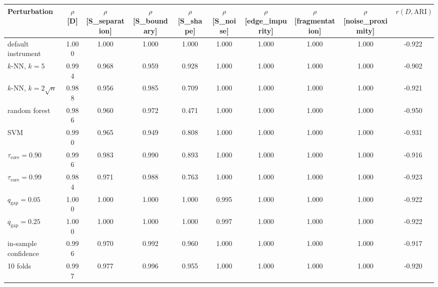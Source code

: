 \begin{tabular}{@{}lccccccccc@{}}
\toprule
Perturbation & $\rho$[D] & $\rho$[S\_separation] & $\rho$[S\_boundary] & $\rho$[S\_shape] & $\rho$[S\_noise] & $\rho$[edge\_impurity] & $\rho$[fragmentation] & $\rho$[noise\_proximity] & $r(D,\text{ARI})$ \\
\midrule
default instrument & 1.000 & 1.000 & 1.000 & 1.000 & 1.000 & 1.000 & 1.000 & 1.000 & -0.922 \\
$k$-NN, $k = 5$ & 0.994 & 0.968 & 0.959 & 0.928 & 1.000 & 1.000 & 1.000 & 1.000 & -0.902 \\
$k$-NN, $k = 2\sqrt{n}$ & 0.988 & 0.956 & 0.985 & 0.709 & 1.000 & 1.000 & 1.000 & 1.000 & -0.921 \\
random forest & 0.986 & 0.960 & 0.972 & 0.471 & 1.000 & 1.000 & 1.000 & 1.000 & -0.950 \\
SVM & 0.990 & 0.965 & 0.949 & 0.808 & 1.000 & 1.000 & 1.000 & 1.000 & -0.931 \\
$\tau_{\text{core}} = 0.90$ & 0.996 & 0.983 & 0.990 & 0.893 & 1.000 & 1.000 & 1.000 & 1.000 & -0.916 \\
$\tau_{\text{core}} = 0.99$ & 0.984 & 0.971 & 0.988 & 0.763 & 1.000 & 1.000 & 1.000 & 1.000 & -0.923 \\
$q_{\text{gap}} = 0.05$ & 1.000 & 1.000 & 1.000 & 1.000 & 0.995 & 1.000 & 1.000 & 1.000 & -0.922 \\
$q_{\text{gap}} = 0.25$ & 1.000 & 1.000 & 1.000 & 1.000 & 0.997 & 1.000 & 1.000 & 1.000 & -0.922 \\
in-sample confidence & 0.996 & 0.970 & 0.992 & 0.960 & 1.000 & 1.000 & 1.000 & 1.000 & -0.917 \\
10 folds & 0.997 & 0.977 & 0.996 & 0.955 & 1.000 & 1.000 & 1.000 & 1.000 & -0.920 \\
\bottomrule
\end{tabular}
